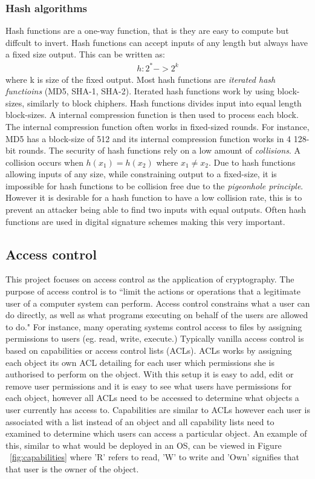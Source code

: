 \documentclass[12pt, titlepage]{article}
\begin{document}
\subsubsection*{Hash algorithms}
Hash functions are a one-way function, that is they are easy to compute but diffcult to invert. Hash functions can accept inputs of any length but always have a fixed size output. This can be written as:
\begin{align*}
h: 2^* -> 2^k
\end{align*}
where k is size of the fixed output.
\newline \indent Most hash functions are \textit{iterated hash functioins} (MD5, SHA-1, SHA-2). Iterated hash functions work by using block-sizes, similarly to block chiphers. Hash functions divides input into equal length block-sizes. A internal compression function is then used to process each block. The internal compression function often works in fixed-sized rounds. For instance, MD5 has a block-size of 512 and its internal compression function works in 4 128-bit rounds.
\newline \indent The security of hash functions rely on a low amount of \textit{collisions}. A collision occurs when $h(x_1) = h(x_2)$ where $x_1 \neq x_2$. Due to hash functions allowing inputs of any size, while constraining output to a fixed-size, it is impossible for hash functions to be collision free due to the \textit{pigeonhole principle}. However it is desirable for a hash function to have a low collision rate, this is to prevent an attacker being able to find two inputs with equal outputs. Often hash functions are used in digital signature schemes making this very important.

\subsection*{Access control}
This project focuses on access control as the application of cryptography. The purpose of access control is to ``limit the actions or operations that a legitimate user of a computer system can perform. Access control constrains what a user can do directly, as well as what programs executing on behalf of the users are allowed to do."\cite{accessControlPrinciples} For instance, many operating systems control access to files by assigning permissions to users (eg. read, write, execute.) Typically vanilla access control is based on capabilities or access control lists (ACLs). ACLs works by assigning each object its own ACL detailing for each user which permissions she is authorised to perform on the object. With this setup it is easy to add, edit or remove user permissions and it is easy to see what users have permissions for each object, however all ACLs need to be accessed to determine what objects a user currently has access to. Capabilities are similar to ACLs however each user is associated with a list instead of an object and all capability lists need to examined to determine which users can access a particular object. An example of this, similar to what would be deployed in an OS, can be viewed in Figure ~\ref{fig:capabilities} where 'R' refers to read, 'W' to write and 'Own' signifies that that user is the owner of the object.
\end{document}
